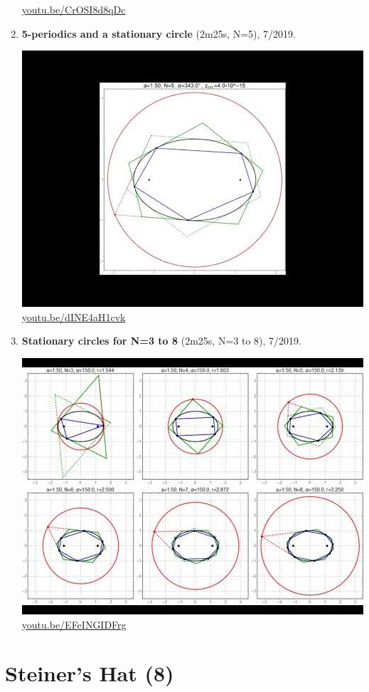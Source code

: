 \documentclass[12pt]{amsart}
\begin{document}
\begin{enumerate}[resume]
\begin{center}
\href{https://youtu.be/CrOSI8d8qDc}{\url{youtu.be/CrOSI8d8qDc}}\end{center}
% 
\item \textbf{5-periodics and a stationary circle} (2m25s, N=5), 7/2019. 
\begin{center}\includegraphics[width=.5\textwidth]{pics/dINE4aH1cvk.jpg} \\ 
\href{https://youtu.be/dINE4aH1cvk}{\url{youtu.be/dINE4aH1cvk}}\end{center}
% 
\item \textbf{Stationary circles for N=3 to 8} (2m25s, N=3 to 8), 7/2019. 
\begin{center}\includegraphics[width=.5\textwidth]{pics/EFeINGIDFrg.jpg} \\ 
\href{https://youtu.be/EFeINGIDFrg}{\url{youtu.be/EFeINGIDFrg}}\end{center}
% 
\end{enumerate}

\section{Steiner's Hat (8)}
\end{document}
